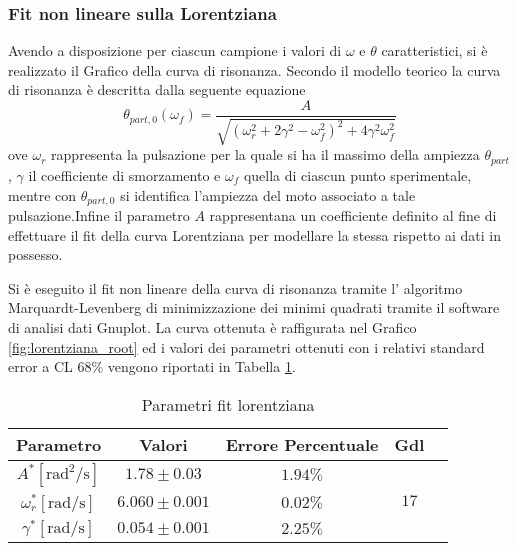 \documentclass[a4paper,11pt,oneside]{article}
\begin{document}
\subsubsection{Fit non lineare sulla Lorentziana}


Avendo a disposizione per ciascun campione i valori di $\omega$ e $\theta$ caratteristici, si è realizzato il Grafico della curva di risonanza. Secondo il modello teorico la curva di risonanza è descritta dalla seguente equazione
\begin{equation*}
    \theta_{part, 0}(\omega_{f}) = \frac{A}{\sqrt{(\omega_{r}^2+ 2\gamma^2-\omega_{f}^2)^2+4\gamma^2\omega_{f}^2}}
\end{equation*}
ove $\omega_{r}$ rappresenta la pulsazione per la quale si ha il massimo della ampiezza $\theta_{part}$, $\gamma$ il coefficiente di smorzamento e $\omega_{f}$ quella di ciascun punto sperimentale, mentre con $\theta_{part,0}$ si identifica l'ampiezza del moto associato a tale pulsazione.Infine il parametro $A$ rappresentana un  coefficiente definito al fine di effettuare il fit della curva Lorentziana per modellare la stessa rispetto ai dati in possesso.

Si è eseguito il fit non lineare della curva di risonanza tramite l' algoritmo Marquardt-Levenberg di minimizzazione dei minimi quadrati tramite il software di analisi dati Gnuplot.
La curva ottenuta è raffigurata nel Grafico \ref{fig:lorentziana_root} ed i valori dei parametri ottenuti con i relativi standard error a CL 68\% vengono riportati in Tabella \ref{tab:parametri_fit_lorentziana}. \newline

\begin{table}[h!]
    \centering
    \begin{tabular}{|c|c|c|c|c|}
        \hline
        Parametro & Valori & Errore Percentuale & Gdl \\ \hline
        \cellcolor[rgb]{0.85,0.85,0.85}$A^{\ast}  [ \si{\radian\squared\per\second} ]$ & \cellcolor[rgb]{0.85,0.85,0.85}$1.78\pm0.03$ & \cellcolor[rgb]{0.85,0.85,0.85}$1.94\%$ & \multirow{3}{*}{$17$}  \\ \cline{1-3}
        $\omega_{r}^{\ast} [\si{\radian\per\second}]$ & $6.060\pm0.001$ & $0.02\%$ &  \\ \cline{1-3}
        \cellcolor[rgb]{0.85,0.85,0.85} $\gamma^{\ast} [\si{\radian\per\second}]$& \cellcolor[rgb]{0.85,0.85,0.85}$0.054\pm0.001$ & \cellcolor[rgb]{0.85,0.85,0.85}$2.25\%$ &  \\ \hline
    \end{tabular}
    \caption{Parametri fit lorentziana}
    \label{tab:parametri_fit_lorentziana}
\end{table}
\end{document}
